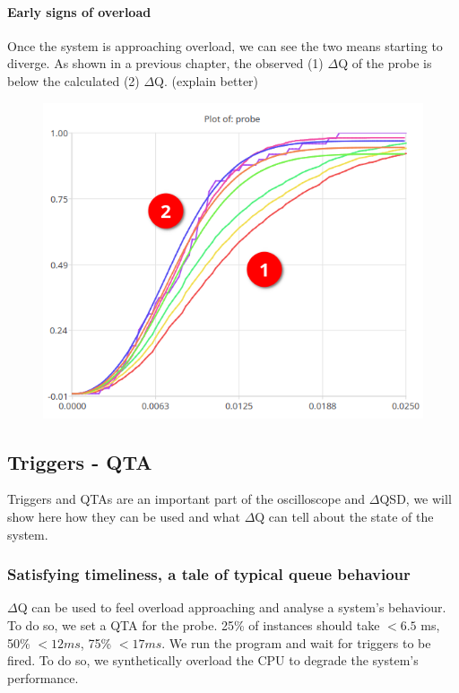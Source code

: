 \paragraph{Early signs of overload}
    
    Once the system is approaching overload, we can see the two means starting to diverge. As shown in a previous chapter, the observed (1) $\Delta$Q of the probe is below the calculated (2) $\Delta$Q. (explain better) 
    \begin{figure}[H]
        \begin{center}
            \includegraphics[scale=0.6]{img/diverging11.png}
        \end{center}
    \end{figure}

    \subsection{Triggers - QTA}
        Triggers and QTAs are an important part of the oscilloscope and $\Delta$QSD, we will show here how they can be used and what $\Delta$Q can tell about the state of the system.

        \subsubsection{Satisfying timeliness, a tale of typical queue behaviour}

        $\Delta$Q can be used to feel overload approaching and analyse a system's behaviour. To do so, we set a QTA for the probe. 25\% of instances should take $< 6.5$ ms, 50\% $<12 ms$, 75\% $<17 ms$. We run the program and wait for triggers to be fired. To do so, we synthetically overload the CPU to degrade the system's performance.
         
